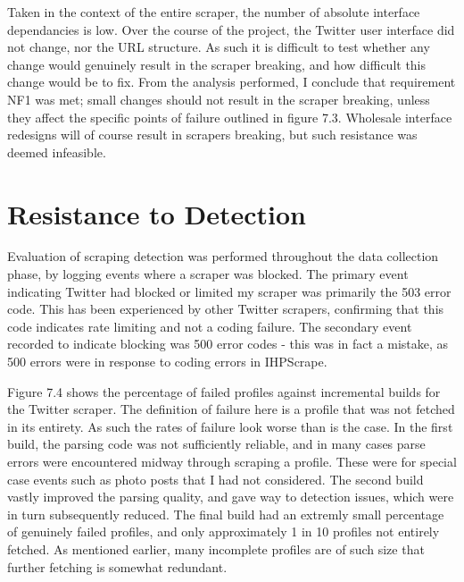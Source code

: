 Taken in the context of the entire scraper, the number of absolute interface dependancies is low. Over the course of the project, the Twitter user interface did not change, nor the URL structure. As such it is difficult to test whether any change would genuinely result in the scraper breaking, and how difficult this change would be to fix. From the analysis performed, I conclude that requirement NF1 was met; small changes should not result in the scraper breaking, unless they affect the specific points of failure outlined in figure 7.3. Wholesale interface redesigns will of course result in scrapers breaking, but such resistance was deemed infeasible. %

\section{Resistance to Detection}

Evaluation of scraping detection was performed throughout the data collection phase, by logging events where a scraper was blocked. The primary event indicating Twitter had blocked or limited my scraper was primarily the 503 error code. This has been experienced by other Twitter scrapers, confirming that this code indicates rate limiting and not a coding failure. The secondary event recorded to indicate blocking was 500 error codes - this was in fact a mistake, as 500 errors were in response to coding errors in IHPScrape.

Figure 7.4 shows the percentage of failed profiles against incremental builds for the Twitter scraper. The definition of failure here is a profile that was not fetched in its entirety. As such the rates of failure look worse than is the case. In the first build, the parsing code was not sufficiently reliable, and in many cases parse errors were encountered midway through scraping a profile. These were for special case events such as photo posts that I had not considered. The second build vastly improved the parsing quality, and gave way to detection issues, which were in turn subsequently reduced. The final build had an extremly small percentage of genuinely failed profiles, and only approximately 1 in 10 profiles not entirely fetched. As mentioned earlier, many incomplete profiles are of such size that further fetching is somewhat redundant. 


